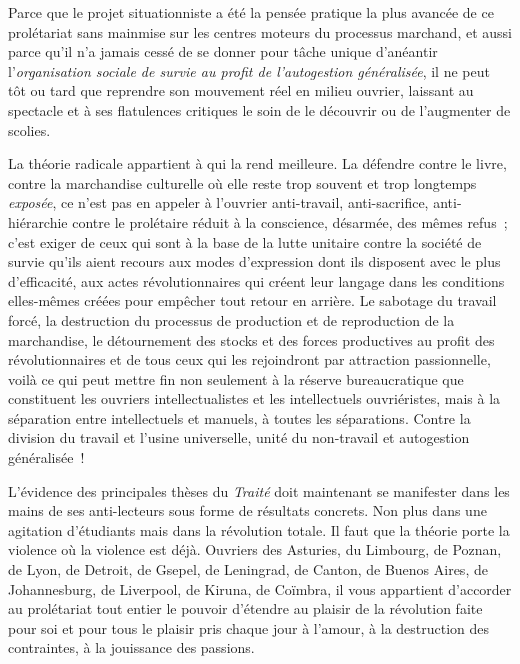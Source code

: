 \documentclass[french,twoside]{book} %
\begin{document}
Parce que le projet situationniste a été la pensée pratique la plus avancée de ce prolétariat sans mainmise sur les centres moteurs du processus marchand, et aussi parce qu’il n’a jamais cessé de se donner pour tâche unique d’anéantir l’\emph{organisation sociale de survie au profit de l’autogestion généralisée}, il ne peut tôt ou tard que reprendre son mouvement réel en milieu ouvrier, laissant au spectacle et à ses flatulences critiques le soin de le découvrir ou de l’augmenter de scolies.\par
La théorie radicale appartient à qui la rend meilleure. La défendre contre le livre, contre la marchandise culturelle où elle reste trop souvent et trop longtemps \emph{exposée}, ce n’est pas en appeler à l’ouvrier anti-travail, anti-sacrifice, anti-hiérarchie contre le prolétaire réduit à la conscience, désarmée, des mêmes refus ; c’est exiger de ceux qui sont à la base de la lutte unitaire contre la société de survie qu’ils aient recours aux modes d’expression dont ils disposent avec le plus d’efficacité, aux actes révolutionnaires qui créent leur langage dans les conditions elles-mêmes créées pour empêcher tout retour en arrière. Le sabotage du travail forcé, la destruction du processus de production et de reproduction de la marchandise, le détournement des stocks et des forces productives au profit des révolutionnaires et de tous ceux qui les rejoindront par attraction passionnelle, voilà ce qui peut mettre fin non seulement à la réserve bureaucratique que constituent les ouvriers intellectualistes et les intellectuels ouvriéristes, mais à la séparation entre intellectuels et manuels, à toutes les séparations. Contre la division du travail et l’usine universelle, unité du non-travail et autogestion généralisée !\par
L’évidence des principales thèses du \emph{Traité} doit maintenant se manifester dans les mains de ses anti-lecteurs sous forme de résultats concrets. Non plus dans une agitation d’étudiants mais dans la révolution totale. Il faut que la théorie porte la violence où la violence est déjà. Ouvriers des Asturies, du Limbourg, de Poznan, de Lyon, de Detroit, de Gsepel, de Leningrad, de Canton, de Buenos Aires, de Johannesburg, de Liverpool, de Kiruna, de Coïmbra, il vous appartient d’accorder au prolétariat tout entier le pouvoir d’étendre au plaisir de la révolution faite pour soi et pour tous le plaisir pris chaque jour à l’amour, à la destruction des contraintes, à la jouissance des passions.\par
\end{document}
